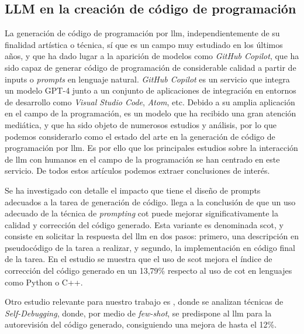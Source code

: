 \subsection{LLM en la creación de código de programación}
\label{sec:llm_creacion_codigo_programacion_estado_cuestion}

La generación de código de programación por \gls{llm}, independientemente de su finalidad artística o técnica, sí que es un campo muy estudiado en los últimos años, y que ha dado lugar a la aparición de modelos como \emph{GitHub Copilot}, que ha sido capaz de generar código de programación de considerable calidad a partir de inputs o \emph{prompts} en lenguaje natural. \emph{GitHub Copilot} es un servicio que integra un modelo GPT-4 junto a un conjunto de aplicaciones de integración en entornos de desarrollo como \emph{Visual Studio Code}, \emph{Atom}, etc. Debido a su amplia aplicación en el campo de la programación, es un modelo que ha recibido una gran atención mediática, y que ha sido objeto de numerosos estudios y análisis, por lo que podemos considerarlo como el estado del arte en la generación de código de programación por \gls{llm}. Es por ello que los principales estudios sobre la interacción de \gls{llm} con humanos en el campo de la programación se han centrado en este servicio. De todos estos artículos podemos extraer conclusiones de interés.

Se ha investigado con detalle el impacto que tiene el diseño de prompts adecuados a la tarea de generación de código. \cite{liStructuredChainofThoughtPrompting2023} llega a la conclusión de que un uso adecuado de la técnica de \emph{prompting} \gls{cot} puede mejorar significativamente la calidad y corrección del código generado. Esta variante es denominada \gls{scot}, y consiste en solicitar la respuesta del \gls{llm} en dos pasos: primero, una descripción en pseudocódigo de la tarea a realizar, y segundo, la implementación en código final de la tarea. En el estudio se muestra que el uso de \gls{scot} mejora el índice de corrección del código generado en un 13,79\% respecto al uso de \gls{cot} en lenguajes como Python o C++.

Otro estudio relevante para nuestro trabajo es \cite{chenTeachingLargeLanguage2023}, donde se analizan técnicas de \emph{Self-Debugging}, donde, por medio de \emph{few-shot}, se predispone al \gls{llm} para la autorevisión del código generado, consiguiendo una mejora de hasta el 12\%.

